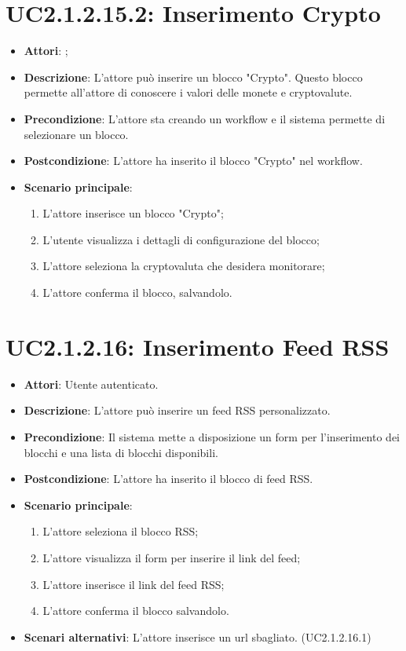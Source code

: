 \section{UC2.1.2.15.2: Inserimento Crypto}
\label{UC2.1.2.15.2}
\begin{itemize}
	\item \textbf{Attori}: ;
	\item \textbf{Descrizione}: L'attore può inserire un blocco "Crypto". Questo blocco permette all'attore di conoscere i valori delle monete e cryptovalute.
	\item \textbf{Precondizione}: L'attore sta creando un workflow e il sistema permette di selezionare un blocco.
	\item \textbf{Postcondizione}: L'attore ha inserito il blocco "Crypto" nel workflow.
	\item \textbf{Scenario principale}:
	\begin{enumerate} \item L'attore inserisce un blocco "Crypto";  \item  L'utente visualizza i dettagli di configurazione del blocco;   \item  L'attore seleziona la cryptovaluta che desidera monitorare; \item L'attore conferma il blocco, salvandolo. \end{enumerate}
\end{itemize}

\section{UC2.1.2.16: Inserimento Feed RSS}
\label{UC2.1.2.16}
\begin{itemize}
	\item \textbf{Attori}: Utente autenticato.
	\item \textbf{Descrizione}: L'attore può inserire un feed RSS personalizzato.
	\item \textbf{Precondizione}: Il sistema mette a disposizione un form per l'inserimento dei blocchi e una lista di blocchi disponibili.
	\item \textbf{Postcondizione}: L'attore ha inserito il blocco di feed RSS.
	\item \textbf{Scenario principale}:
	\begin{enumerate} \item L'attore seleziona il blocco RSS; \item L'attore visualizza il form per inserire il link del feed; \item  L'attore inserisce il link del feed RSS; \item L'attore conferma il blocco salvandolo.\end{enumerate}
	\item \textbf{Scenari alternativi}:
	L'attore inserisce un url sbagliato. (UC2.1.2.16.1)
\end{itemize}


